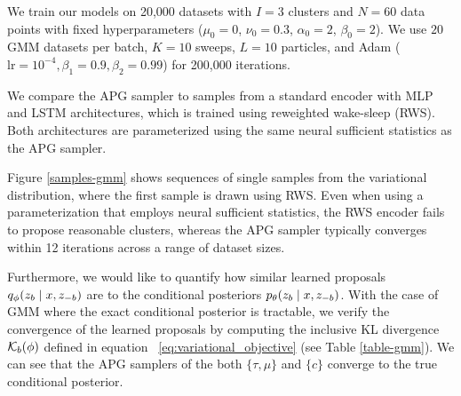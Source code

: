 \documentclass[anonymous=false, %
               format=acmsmall, %
               review=true, %
               screen=true, %
               nonacm=true]{acmart}
\theoremstyle{definition}
\begin{document}
We train our models on 20,000 datasets with $I = 3$ clusters and $N = 60$ data points with fixed hyperparameters ($\mu_0 = 0$, $\nu_0 = 0.3$, $\alpha_0 = 2$, $\beta_0 = 2$). We use $20$ GMM datasets per batch, $K=10$ sweeps, $L=10$ particles, and Adam ($\mathrm{lr} = 10^{-4}, \beta_1 = 0.9, \beta_2 = 0.99$) for 200,000 iterations.

We compare the APG sampler to samples from a standard encoder with MLP and LSTM architectures,  which is trained using reweighted wake-sleep (RWS). Both architectures are parameterized using the same neural sufficient statistics as the APG sampler.

Figure \ref{samples-gmm} shows sequences of single samples from the variational distribution, where the first sample is drawn using RWS. Even when using a parameterization that employs neural sufficient statistics, the RWS encoder fails to propose reasonable clusters, whereas the APG sampler typically converges within 12 iterations across a range of dataset sizes.

Furthermore, we would like to quantify how similar learned proposals $q_\phi(z_b \mid x, z_{-b})$ are to the conditional posteriors $p_\theta(z_b \mid x, z_{-b})$. With the case of GMM where the exact conditional posterior is tractable, we verify the convergence of the learned proposals by computing the inclusive KL divergence $\mathcal{K}_b(\phi)$ defined in equation ~\ref{eq:variational_objective} (see Table \ref{table-gmm}). We can see that the APG samplers of the both $\{\tau, \mu\}$ and $\{c\}$ converge to the true conditional posterior.


\end{document}
